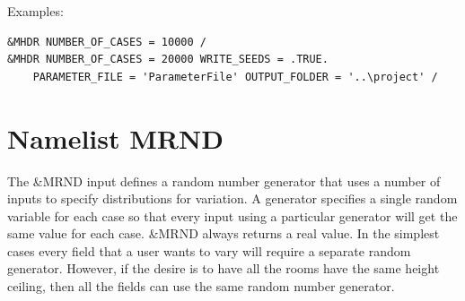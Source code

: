 \documentclass[12pt,twoside]{book}
\begin{document}
\vspace{\baselineskip}
\noindent Examples:
\begin{lstlisting}[language=cdata, basicstyle=\scriptsize]
&MHDR NUMBER_OF_CASES = 10000 /
&MHDR NUMBER_OF_CASES = 20000 WRITE_SEEDS = .TRUE.
    PARAMETER_FILE = 'ParameterFile' OUTPUT_FOLDER = '..\project' /
\end{lstlisting}


\section{Namelist MRND}
\label{info:MRND}

The {\ct \&MRND} input defines a random number generator that uses a number of inputs to specify distributions for variation. A generator specifies a single random variable for each case so that every input using a particular generator will get the same value for each case. {\ct \&MRND} always returns a real value. In the simplest cases every field that a user wants to vary will require a separate random generator. However, if the desire is to have all the rooms have the same height ceiling, then all the fields can use the same random number generator.
\end{document}
